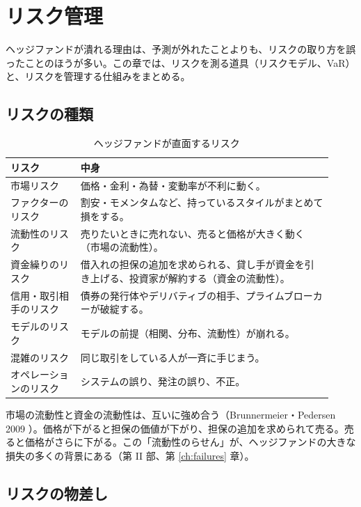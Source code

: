 \chapter{リスク管理}
\label{ch:risk}

ヘッジファンドが潰れる理由は、予測が外れたことよりも、リスクの取り方を誤ったことのほうが多い。この章では、リスクを測る道具（リスクモデル、VaR）と、リスクを管理する仕組みをまとめる。

\section{リスクの種類}

\begin{table}[H]
\centering\small
\caption{ヘッジファンドが直面するリスク}
\label{tab:risks}
\begin{tabular}{@{}P{0.2\linewidth}P{0.72\linewidth}@{}}
\toprule
リスク & 中身 \\
\midrule
市場リスク & 価格・金利・為替・変動率が不利に動く。 \\
ファクターのリスク & 割安・モメンタムなど、持っているスタイルがまとめて損をする。 \\
流動性のリスク & 売りたいときに売れない、売ると価格が大きく動く（市場の流動性）。 \\
資金繰りのリスク & 借入れの担保の追加を求められる、貸し手が資金を引き上げる、投資家が解約する（資金の流動性）。 \\
信用・取引相手のリスク & 債券の発行体やデリバティブの相手、プライムブローカーが破綻する。 \\
モデルのリスク & モデルの前提（相関、分布、流動性）が崩れる。 \\
混雑のリスク & 同じ取引をしている人が一斉に手じまう。 \\
オペレーションのリスク & システムの誤り、発注の誤り、不正。 \\
\bottomrule
\end{tabular}
\end{table}

市場の流動性と資金の流動性は、互いに強め合う（Brunnermeier・Pedersen 2009 \cite{brunnermeierpedersen2009}）。価格が下がると担保の価値が下がり、担保の追加を求められて売る。売ると価格がさらに下がる。この「流動性のらせん」が、ヘッジファンドの大きな損失の多くの背景にある（第 II 部、第 \ref{ch:failures} 章）。

\section{リスクの物差し}

